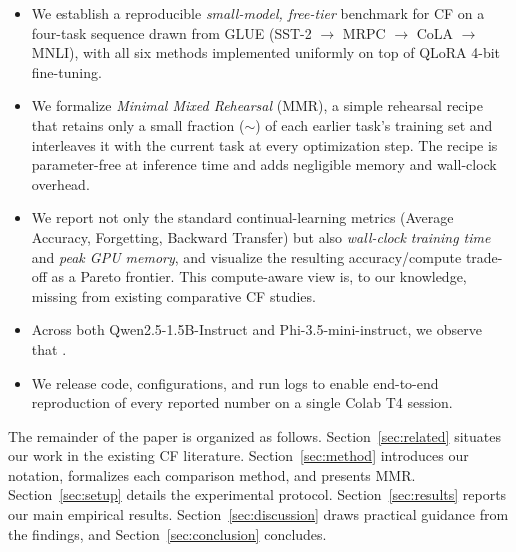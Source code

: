 \begin{itemize}
    \item We establish a reproducible \emph{small-model,
    free-tier} benchmark for CF on a four-task sequence drawn from
    GLUE (SST-2 $\rightarrow$ MRPC $\rightarrow$ CoLA $\rightarrow$
    MNLI), with all six methods implemented uniformly on top of
    QLoRA 4-bit fine-tuning.

    \item We formalize \emph{Minimal Mixed Rehearsal} (MMR), a simple
    rehearsal recipe that retains only a small fraction
    ($\sim$) of each earlier task's training set and
    interleaves it with the current task at every optimization step.
    The recipe is parameter-free at inference time and adds
    negligible memory and wall-clock overhead.

    \item We report not only the standard continual-learning metrics
    (Average Accuracy, Forgetting, Backward Transfer) but also
    \emph{wall-clock training time} and \emph{peak GPU memory}, and
    visualize the resulting accuracy/compute trade-off as a Pareto
    frontier. This compute-aware view is, to our knowledge, missing
    from existing comparative CF studies.

    \item Across both Qwen2.5-1.5B-Instruct and Phi-3.5-mini-instruct,
    we observe that
    .

    \item We release code, configurations, and run logs to enable
    end-to-end reproduction of every reported number on a single
    Colab T4 session.
\end{itemize}

The remainder of the paper is organized as follows.
Section~\ref{sec:related} situates our work in the existing CF
literature. Section~\ref{sec:method} introduces our notation,
formalizes each comparison method, and presents MMR.
Section~\ref{sec:setup} details the experimental protocol.
Section~\ref{sec:results} reports our main empirical results.
Section~\ref{sec:discussion} draws practical guidance from the
findings, and Section~\ref{sec:conclusion} concludes.
